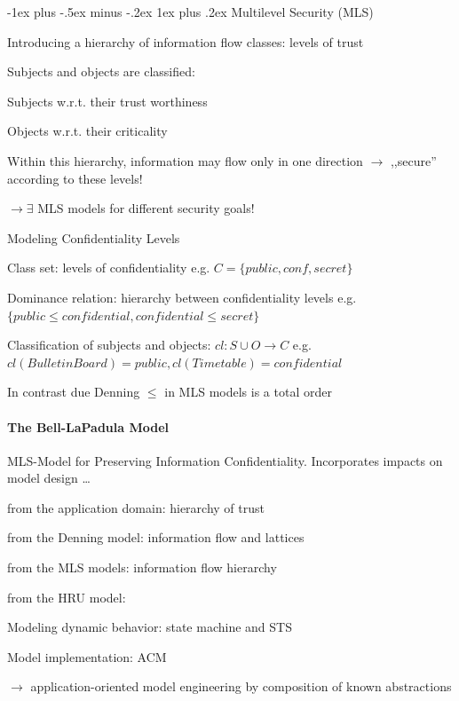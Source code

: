 \documentclass[a4paper]{article}
\makeatletter
\renewcommand{\subsubsection}{\@startsection{subsubsection}{3}{0mm}%
                {-1ex plus -.5ex minus -.2ex}%
                {1ex plus .2ex}%
                {\normalfont\small\bfseries}}
\makeatother
\begin{document}
\begin{multicols}{3}
    \subsubsection{Multilevel Security (MLS)}
    \begin{itemize*}
        \item Introducing a hierarchy of information flow classes: levels of trust
        \item Subjects and objects are classified:
        \begin{itemize*}
            \item Subjects w.r.t. their trust worthiness
            \item Objects w.r.t. their criticality
        \end{itemize*}
        \item Within this hierarchy, information may flow only in one direction $\rightarrow$ ,,secure'' according to these levels!
        \item $\rightarrow \exists$ MLS models for different security goals!
    \end{itemize*}

    Modeling Confidentiality Levels
    \begin{itemize*}
        \item Class set: levels of confidentiality e.g. $C=\{public,conf,secret\}$
        \item Dominance relation: hierarchy between confidentiality levels e.g. $\{public \leq confidential,confidential \leq secret\}$
        \item Classification of subjects and objects: $cl:S\cup O\rightarrow C$ e.g. $cl(BulletinBoard)=public,cl(Timetable)=confidential$
        \item In contrast due Denning $\leq$ in MLS models is a total order
    \end{itemize*}

    \paragraph{The Bell-LaPadula Model}
    MLS-Model for Preserving Information Confidentiality.
    Incorporates impacts on model design \dots
    \begin{itemize*}
        \item from the application domain: hierarchy of trust
        \item from the Denning model: information flow and lattices
        \item from the MLS models: information flow hierarchy
        \item from the HRU model:
        \begin{itemize*}
            \item Modeling dynamic behavior: state machine and STS
            \item Model implementation: ACM
        \end{itemize*}
        \item[$\rightarrow$] application-oriented model engineering by composition of known abstractions
    \end{itemize*}


\end{multicols}
\end{document}
